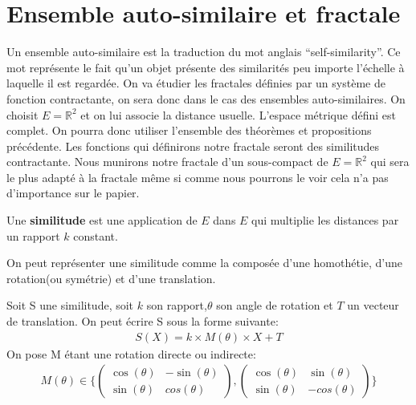 \documentclass[a4paper, 12pt]{report}
\begin{document}
		\section{Ensemble auto-similaire et fractale}
			Un ensemble auto-similaire est la traduction du mot anglais ``self-similarity''. Ce mot représente le fait qu'un objet présente des similarités peu importe l'échelle à laquelle il est regardée. On va étudier les fractales définies par un système de fonction contractante, on sera donc dans le cas des ensembles auto-similaires. On choisit $E=\mathds{R}^2$ et on lui associe la distance usuelle. L'espace métrique défini est complet. On pourra donc utiliser l'ensemble des théorèmes et propositions précédente. Les fonctions qui définirons notre fractale seront des similitudes contractante. Nous munirons notre fractale d'un sous-compact de $E=\mathds{R}^2$ qui sera le plus adapté à la fractale même si comme nous pourrons le voir cela n'a pas d'importance sur le papier. 
			\begin{definition}
				Une \textbf{similitude} est une application de $E$ dans $E$ qui multiplie les distances par un rapport $k$ constant.
			\end{definition}
			\begin{remark*}
				On peut représenter une similitude comme la composée d'une homothétie, d'une rotation(ou symétrie) et d'une translation.
			\end{remark*}
			\begin{prop}
				Soit S une similitude, soit $k$ son rapport,$\theta$ son angle de rotation et $T$ un vecteur de translation. On peut écrire S sous la forme suivante:
				\begin{align*}
					S(X)=k\times M(\theta)\times X+T
				\end{align*}
				On pose M étant une rotation directe ou indirecte:
				\begin{align*}
					M(\theta)\in\Bigg\{
					\begin{pmatrix}
						\cos(\theta) & -\sin(\theta) \\
						\sin(\theta) & cos(\theta) 
					\end{pmatrix}
					,
					\begin{pmatrix}
						\cos(\theta) & \sin(\theta) \\
						\sin(\theta) & -cos(\theta) 
					\end{pmatrix}
					\Bigg\}
				\end{align*}
			\end{prop}
\end{document}
